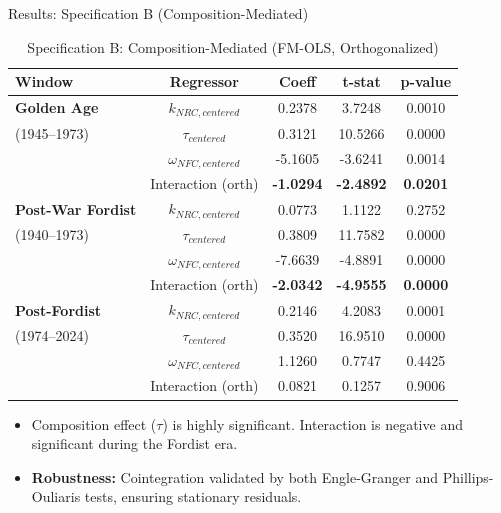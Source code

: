 \documentclass[10pt]{beamer}
\begin{document}
\begin{frame}{Results: Specification B (Composition-Mediated)}
  \begin{table}[htbp]
    \centering
    \caption{Specification B: Composition-Mediated (FM-OLS, Orthogonalized)}
    \footnotesize
    \begin{tabular}{lcccc}
      \toprule
      \textbf{Window} & \textbf{Regressor} & \textbf{Coeff} & \textbf{t-stat} & \textbf{p-value} \\
      \midrule
      \textbf{Golden Age} & $k_{NRC, centered}$ & 0.2378 & 3.7248 & 0.0010 \\
      (1945--1973) & $\tau_{centered}$ & 0.3121 & 10.5266 & 0.0000 \\
      & $\omega_{NFC, centered}$ & -5.1605 & -3.6241 & 0.0014 \\
      & Interaction (orth) & \textbf{-1.0294} & \textbf{-2.4892} & \textbf{0.0201} \\
      \midrule
      \textbf{Post-War Fordist} & $k_{NRC, centered}$ & 0.0773 & 1.1122 & 0.2752 \\
      (1940--1973) & $\tau_{centered}$ & 0.3809 & 11.7582 & 0.0000 \\
      & $\omega_{NFC, centered}$ & -7.6639 & -4.8891 & 0.0000 \\
      & Interaction (orth) & \textbf{-2.0342} & \textbf{-4.9555} & \textbf{0.0000} \\
      \midrule
      \textbf{Post-Fordist} & $k_{NRC, centered}$ & 0.2146 & 4.2083 & 0.0001 \\
      (1974--2024) & $\tau_{centered}$ & 0.3520 & 16.9510 & 0.0000 \\
      & $\omega_{NFC, centered}$ & 1.1260 & 0.7747 & 0.4425 \\
      & Interaction (orth) & 0.0821 & 0.1257 & 0.9006 \\
      \bottomrule
    \end{tabular}
  \end{table}
  \begin{itemize}
    \item Composition effect ($\tau$) is highly significant. Interaction is negative and significant during the Fordist era.
    \item \textbf{Robustness:} Cointegration validated by both Engle-Granger and Phillips-Ouliaris tests, ensuring stationary residuals.
  \end{itemize}
\end{frame}
\end{document}
